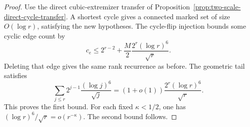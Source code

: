 \begin{proof}
Use the direct cubic-extremizer transfer of Proposition~\ref{prop:two-scale-direct-cycle-transfer}.
A shortest cycle gives a connected marked set of size $O(\log r)$, satisfying the new hypotheses.
The cycle-flip injection bounds some cyclic edge count by
\[
 c_e\le2^{r-2}+\frac M2\frac{2^r(\log r)^6}{\sqrt r}.
\]
Deleting that edge gives the same rank recurrence as before.
The geometric tail satisfies
\[
 \sum_{j\le r}2^{j-1}\frac{(\log j)^6}{\sqrt j}
 =(1+o(1))\frac{2^r(\log r)^6}{\sqrt r}.
\]
This proves the first bound.
For each fixed $\kappa<1/2$, one has $(\log r)^6/\sqrt r=o(r^{-\kappa})$.
The second bound follows.
\end{proof}
